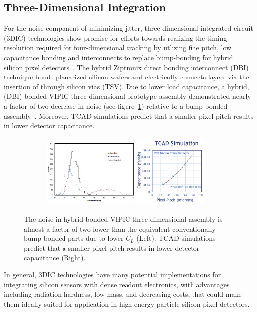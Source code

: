 \begin{refsection}
\section{Three-Dimensional Integration}
For the noise component of minimizing jitter, three-dimensional integrated circuit (3DIC) technologies show promise for efforts towards realizing the timing resolution required for four-dimensional tracking by utlizing fine pitch, low capacitance bonding and interconnects to replace bump-bonding for hybrid silicon pixel detectors~\cite{7167712,7027258}. 
The hybrid Ziptronix direct bonding interconnect (DBI) technique bonds planarized silicon wafers and electrically connects layers via the insertion of through silicon vias (TSV). 
Due to lower load capacitance, a hybrid, (DBI) bonded VIPIC three-dimensional prototype assembly demonstrated nearly a factor of two decrease in noise (see figure~\ref{FusionBondedNoise_PixelPitchCapacitance}) relative to a bump-bonded assembly~\cite{Lipton:2018mqk}.  
Moreover, TCAD simulations predict that a smaller pixel pitch results in lower detector capacitance.
\begin{figure}[htb]
  \begin{center}
    \begin{tabular}{cc}
        \includegraphics[width=0.45\textwidth]{fig_FastTiming/FusionBondedNoise.png}
        \includegraphics[width=0.35\textwidth]{fig_FastTiming/PixelPitch_Capacitance.png}
    \end{tabular}
    \caption{The noise in hybrid bonded VIPIC three-dimensional assembly is almost a factor of two lower than the equivalent conventionally bump bonded parts due to lower $C_L$ (Left).
            TCAD simulations predict that a smaller pixel pitch results in lower detector capacitance (Right).
            }            
    \label{FusionBondedNoise_PixelPitchCapacitance}
  \end{center}
\end{figure}
In general, 3DIC technologies have many potential implementations for integrating silicon sensors with dense readout electronics, with advantages including radiation hardness, low mass, and decreasing costs, that could make them ideally suited for application in high-energy particle silicon pixel detectors.


\end{refsection}
